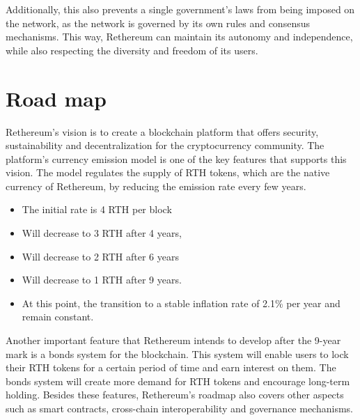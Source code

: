 \documentclass[a4paper,onecolumn, superscriptaddress,10pt,accepted=2020-05-01,issue=1, volume=2, shorttitle=papers]{compositionalityarticle}
\begin{document}
\vspace{0.3cm}

Additionally, this also prevents a single government's laws from being imposed on the network, as the network is governed by its own rules and consensus mechanisms. This way, Rethereum can maintain its autonomy and independence, while also respecting the diversity and freedom of its users.

\vspace{1cm}

\section{Road map}

Rethereum's vision is to create a blockchain platform that offers security, sustainability and decentralization for the cryptocurrency community. The platform's currency emission model is one of the key features that supports this vision. The model regulates the supply of RTH tokens, which are the native currency of Rethereum, by reducing the emission rate every few years. 

\begin{itemize}
    \item The initial rate is 4 RTH per block
\end{itemize}
\begin{itemize}
    \item Will decrease to 3 RTH after 4 years,
\end{itemize}
\begin{itemize}
    \item Will decrease to 2 RTH after 6 years
\end{itemize}
\begin{itemize}
    \item Will decrease to 1 RTH after 9 years.
    \item At this point, the transition to a stable inflation rate of 2.1\% per year and remain constant.
\end{itemize}

Another important feature that Rethereum intends to develop after the 9-year mark is a bonds system for the blockchain. This system will enable users to lock their RTH tokens for a certain period of time and earn interest on them. The bonds system will create more demand for RTH tokens and encourage long-term holding. Besides these features, Rethereum's roadmap also covers other aspects such as smart contracts, cross-chain interoperability and governance mechanisms.
\end{document}
